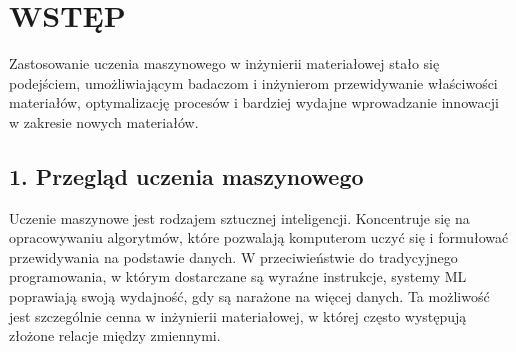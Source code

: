 

{}
\fontsize{14}{16}\selectfont
\setlength{\parindent}{0pt}
\chapter*{WSTĘP} 
\label{chap:wstep}
\fontsize{12}{14}\selectfont
\vspace{\baselineskip} 

{}
\vspace{-1.0em}
\label{sec:title-of-1st-level-heading}
Zastosowanie uczenia maszynowego w inżynierii materiałowej stało się podejściem, umożliwiającym badaczom i inżynierom przewidywanie właściwości materiałów, optymalizację procesów i bardziej wydajne wprowadzanie innowacji w zakresie nowych materiałów. 





{}
\section*{1. Przegląd uczenia maszynowego}
\vspace{-1.0em}
\label{sec:spacing_font_size}
Uczenie maszynowe jest rodzajem sztucznej inteligencji. 
Koncentruje się na opracowywaniu algorytmów, które pozwalają komputerom uczyć się i formułować przewidywania na podstawie danych. 
W przeciwieństwie do tradycyjnego programowania, w którym dostarczane są wyraźne instrukcje, systemy ML poprawiają swoją wydajność, gdy są narażone na więcej danych. 
Ta możliwość jest szczególnie cenna w inżynierii materiałowej, w której często występują złożone relacje między zmiennymi.

